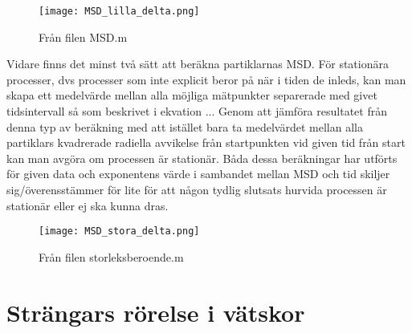 \begin{figure}
    \centering
    \texttt{[image: MSD\_lilla\_delta.png]}
    \caption{Från filen MSD.m}
    \label{fig:MSD_ld}
\end{figure}

Vidare finns det minst två sätt att beräkna partiklarnas MSD. För stationära processer, dvs processer som inte explicit beror på när i tiden de inleds, kan man skapa ett medelvärde mellan alla möjliga mätpunkter separerade med givet tidsintervall så som beskrivet i ekvation ...
Genom att jämföra resultatet från denna typ av beräkning med att istället bara ta medelvärdet mellan alla partiklars kvadrerade radiella avvikelse från startpunkten vid given tid från start kan man avgöra om processen är stationär.
Båda dessa beräkningar har utförts för given data och exponentens värde i sambandet mellan MSD och tid skiljer sig/överensstämmer för lite för att någon tydlig slutsats hurvida processen är stationär eller ej ska kunna dras. 

\begin{figure}
    \centering
    \texttt{[image: MSD\_stora\_delta.png]}
    \caption{Från filen storleksberoende.m}
    \label{fig:MSD_sd}
\end{figure}




\section{Strängars rörelse i vätskor}




